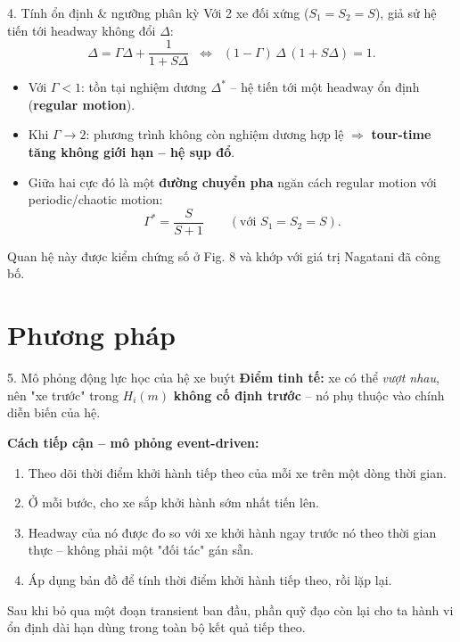 \documentclass[t, aspectratio=169]{beamer}
\begin{document}
\begin{frame}{4. Tính ổn định \& ngưỡng phân kỳ}
	Với 2 xe đối xứng ($S_1=S_2=S$), giả sử hệ tiến tới headway không đổi $\Delta$:
	\[
		\Delta = \Gamma\Delta + \frac{1}{1+S\Delta}
		\;\;\Longleftrightarrow\;\;
		(1-\Gamma)\,\Delta\,(1+S\Delta) = 1.
	\]

	\begin{itemize}
		\item Với $\Gamma < 1$: tồn tại nghiệm dương $\Delta^*$ -- hệ tiến tới một headway ổn định (\textbf{regular motion}).
		\item Khi $\Gamma \to 2$: phương trình không còn nghiệm dương hợp lệ $\Rightarrow$ \textbf{tour-time tăng không giới hạn -- hệ sụp đổ}.
		\item Giữa hai cực đó là một \textbf{đường chuyển pha} ngăn cách regular motion với periodic/chaotic motion:
		\[
			\Gamma^* = \frac{S}{S+1} \qquad (\text{với } S_1=S_2=S).
		\]
	\end{itemize}

	\small Quan hệ này được kiểm chứng số ở Fig. 8 và khớp với giá trị Nagatani đã công bố.
\end{frame}

\section{Phương pháp}

\begin{frame}{5. Mô phỏng động lực học của hệ xe buýt}
	\textbf{Điểm tinh tế:} xe có thể \emph{vượt nhau}, nên "xe trước" trong $H_i(m)$ \textbf{không cố định trước} -- nó phụ thuộc vào chính diễn biến của hệ.

	\vspace{0.5em}
	\textbf{Cách tiếp cận -- mô phỏng event-driven:}
	\begin{enumerate}
		\item Theo dõi thời điểm khởi hành tiếp theo của mỗi xe trên một dòng thời gian.
		\item Ở mỗi bước, cho xe sắp khởi hành sớm nhất tiến lên.
		\item Headway của nó được đo so với xe khởi hành ngay trước nó theo thời gian thực -- không phải một "đối tác" gán sẵn.
		\item Áp dụng bản đồ để tính thời điểm khởi hành tiếp theo, rồi lặp lại.
	\end{enumerate}

	\vspace{0.5em}
	Sau khi bỏ qua một đoạn transient ban đầu, phần quỹ đạo còn lại cho ta hành vi ổn định dài hạn dùng trong toàn bộ kết quả tiếp theo.
\end{frame}
\end{document}
